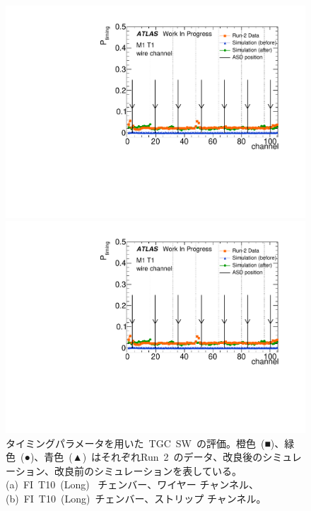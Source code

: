 \begin{figure}[tbp]
	\begin{minipage}{0.49\hsize}
	\centering			
	\includegraphics[width=\textwidth,page=36]{img/pdf5/master_timingplot_comp.pdf}
	\subcaption{}
	\end{minipage}
	\begin{minipage}{0.49\hsize}
	\centering
	\includegraphics[width=\textwidth,page=37]{img/pdf5/master_timingplot_comp.pdf}
	\subcaption{}
	\end{minipage}
    \caption[タイミングパラメータを用いた~TGC~SW~の評価]{タイミングパラメータを用いた~TGC~SW~の評価。橙色~(■)、緑色~(●)、青色~(▲)~はそれぞれRun~2~のデータ、改良後のシミュレーション、改良前のシミュレーションを表している。(a)~FI~T10~(Long)~ チェンバー、ワイヤー チャンネル、(b)~FI~T10~(Long)~チェンバー、ストリップ チャンネル。}
	\label{fig:timingPlotSW}
\end{figure}

